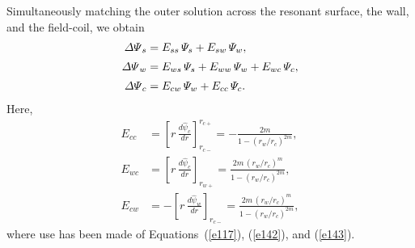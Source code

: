 \documentclass[notitlepage,12pt]{article}
\begin{document}
Simultaneously matching the outer solution across the resonant surface, the wall, and the field-coil, we
obtain
\begin{align}\label{e146}
{\mit\Delta\Psi}_s &= E_{ss}\,{\mit\Psi}_s + E_{sw}\,{\mit\Psi}_w,\\[0.5ex]
{\mit\Delta\Psi}_w &= E_{ws}\,{\mit\Psi}_s + E_{ww}\,{\mit\Psi}_w + E_{wc}\,{\mit\Psi}_c,\\[0.5ex]
{\mit\Delta\Psi}_c&= E_{cw}\,{\mit\Psi}_w + E_{cc}\,{\mit\Psi}_c. \label{e148}
\end{align}
Here,  
\begin{align}
E_{cc} &= \left[r\,\frac{d\hat{\psi}_c}{dr}\right]_{r_{c-}}^{r_{c+}}=- \frac{2m}{1-(r_w/r_c)^{2m}},\\[0.5ex]
E_{wc}&= \left[r\,\frac{d\hat{\psi}_c}{dr}\right]_{r_{w+}} = \frac{2m\,(r_w/r_c)^m}{1-(r_w/r_c)^{2m}},\label{e150a}\\[0.5ex]
E_{cw}&=- \left[r\,\frac{d\hat{\psi}_w}{dr}\right]_{r_{c-}} = \frac{2m\,(r_w/r_c)^m}{1-(r_w/r_c)^{2m}},\label{e151}
\end{align}
where use has been made of Equations~(\ref{e117}), (\ref{e142}), and (\ref{e143}). 
\end{document}
